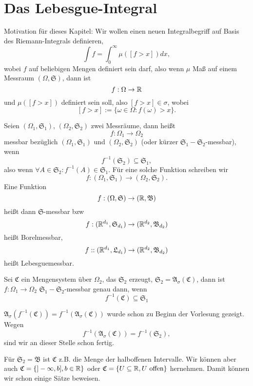 			\chapter{Das Lebesgue-Integral}
			
			Motivation für dieses Kapitel: Wir wollen einen neuen Integralbegriff auf Basis des Riemann-Integrals definieren,
			\[ \int f=\int_0^\infty \mu([f>x])dx, \]
			wobei $f$ auf beliebigen Mengen definiert sein darf, also wenn $\mu$ Maß auf einem Messraum $(\Omega, \mathfrak{S})$, dann ist 
			\[ f:\Omega\to\mathbb{R} \]
			und $\mu([f>x])$ definiert sein soll, also $[f>x]\in\mathfrak{\sigma}$, wobei
			\[ [f>x]:=\{\omega\in\Omega: f(\omega)>x\}. \]
			
			\begin{defi}
				Seien $(\Omega_1, \mathfrak{S}_1)$, $(\Omega_2, \mathfrak{S}_2)$ zwei Messräume, dann heißt 
				\[ f:\Omega_1\to\Omega_2 \]
				messbar bezüglich $(\Omega_1, \mathfrak{S}_1)$ und $(\Omega_2, \mathfrak{S}_2)$ (oder kürzer $\mathfrak{S}_1-\mathfrak{S}_2$-messbar), wenn
				\[ f^{-1}(\mathfrak{S}_2)\subseteq\mathfrak{S}_1, \]
				also wenn $\forall A\in\mathfrak{S}_2: f^{-1}(A)\in\mathfrak{S}_1$. Für eine solche Funktion schreiben wir 
				\[ f:(\Omega_1,\mathfrak{S}_1)\to(\Omega_2, \mathfrak{S}_2). \]
				Eine Funktion
				\[ f:(\Omega,\mathfrak{S})\to(\mathbb{R},\mathfrak{B}) \]
				heißt dann $\mathfrak{S}$-messbar bzw
				\[ f:(\mathbb{R}^{d_1},\mathfrak{S}_{d_1})\to(\mathbb{R}^{d_2},\mathfrak{B}_{d_2}) \]
				heißt Borelmessbar,
				\[ f::(\mathbb{R}^{d_1},\mathfrak{L}_{d_1})\to(\mathbb{R}^{d_2},\mathfrak{B}_{d_2}) \]
				heißt Lebesguemessbar. 
			\end{defi}
			
			\begin{satz}
				Sei $\mathfrak{C}$ ein Mengensystem über $\Omega_2$, das $\mathfrak{S}_2$ erzeugt, $\mathfrak{S}_2=\mathfrak{A}_\sigma(\mathfrak{C})$, dann ist $f:\Omega_1\to\Omega_2$ $\mathfrak{S}_1-\mathfrak{S}_2$-messbar genau dann, wenn
				\[ f^{-1}(\mathfrak{C})\subseteq \mathfrak{S}_1 \]
			\end{satz}
			
			\begin{bew}
				$\mathfrak{A}_\sigma(f^{-1}(\mathfrak{C}))=f^{-1}(\mathfrak{A}_\sigma(\mathfrak{C}))$ wurde schon zu Beginn der Vorlesung gezeigt. Wegen
				\[ f^{-1}(\mathfrak{A}_\sigma(\mathfrak{C}))=f^{-1}(\mathfrak{S}_2), \]
				sind wir an dieser Stelle schon fertig. 
			\end{bew}
			
			\begin{bem}
				Für $\mathfrak{S}_2=\mathfrak{B}$ ist $\mathfrak{C}$ z.B. die Menge der halboffenen Intervalle. Wir können aber auch $\mathfrak{C}=\{]-\infty,b],b\in\mathbb{R}\}$ oder $\mathfrak{C}=\{U\subseteq \mathbb{R}, U\text{ offen}\}$ hernehmen. Damit können wir schon einige Sätze beweisen.
			\end{bem}
			
